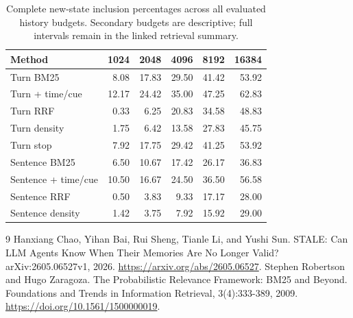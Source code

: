\documentclass{article}
\begin{document}
\begin{table}[ht]\centering\small
\caption{Complete new-state inclusion percentages across all evaluated history budgets. Secondary budgets are descriptive; full intervals remain in the linked retrieval summary.}
\begin{tabular}{lrrrrr}
\toprule
Method & 1024 & 2048 & 4096 & 8192 & 16384\\\midrule
Turn BM25 & 8.08 & 17.83 & 29.50 & 41.42 & 53.92\\
Turn + time/cue & 12.17 & 24.42 & 35.00 & 47.25 & 62.83\\
Turn RRF & 0.33 & 6.25 & 20.83 & 34.58 & 48.83\\
Turn density & 1.75 & 6.42 & 13.58 & 27.83 & 45.75\\
Turn stop & 7.92 & 17.75 & 29.42 & 41.25 & 53.92\\
Sentence BM25 & 6.50 & 10.67 & 17.42 & 26.17 & 36.83\\
Sentence + time/cue & 10.50 & 16.67 & 24.50 & 36.50 & 56.58\\
Sentence RRF & 0.50 & 3.83 & 9.33 & 17.17 & 28.00\\
Sentence density & 1.42 & 3.75 & 7.92 & 15.92 & 29.00\\
\bottomrule\end{tabular}\end{table}
\begin{thebibliography}{9}
 Hanxiang Chao, Yihan Bai, Rui Sheng, Tianle Li, and Yushi Sun. STALE: Can LLM Agents Know When Their Memories Are No Longer Valid? arXiv:2605.06527v1, 2026. \url{https://arxiv.org/abs/2605.06527}.
 Stephen Robertson and Hugo Zaragoza. The Probabilistic Relevance Framework: BM25 and Beyond. Foundations and Trends in Information Retrieval, 3(4):333-389, 2009. \url{https://doi.org/10.1561/1500000019}.
\end{thebibliography}
\end{document}
